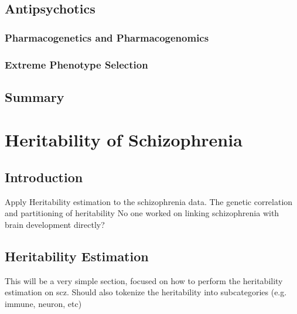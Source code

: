 \documentclass[12pt]{book}
\begin{document}
	
	

	\section{Antipsychotics}
	\subsection{Pharmacogenetics and Pharmacogenomics}
	\subsection{Extreme Phenotype Selection}
	\section{Summary}
	
	
	
	\chapter{Heritability of Schizophrenia}
	\section{Introduction}
	Apply Heritability estimation to the schizophrenia data.
	The genetic correlation and partitioning of heritability
	No one worked on linking schizophrenia with brain development directly?
	\section{Heritability Estimation}
	This will be a very simple section, focused on how to perform the heritability estimation on \acrfull{scz}.
	Should also tokenize the heritability into subcategories (e.g. immune, neuron, etc)
	
\end{document}
